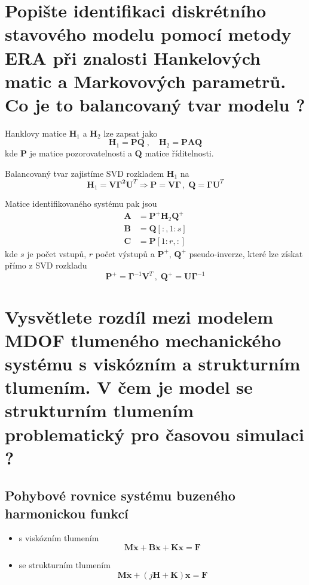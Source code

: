 \documentclass{article}
\begin{document}
	\pagebreak
	\section{Popište identifikaci diskrétního stavového modelu pomocí metody ERA při znalosti Hankelových matic a Markovových parametrů. Co je to balancovaný tvar modelu ? }

	Hanklovy matice $\bm{H}_1$ a $\bm{H}_2$ lze zapsat jako
	\begin{equation}
		\bm{H}_1 = \bm{P}\bm{Q}
		\;,\quad 
		\bm{H}_2 = \bm{P}\bm{A}\bm{Q}
	\end{equation}
	kde $\bm{P}$ je matice pozorovatelnosti a $\bm{Q}$ matice říditelnosti.

	Balancovaný tvar zajistíme SVD rozkladem $\bm{H}_1$ na
	\begin{equation}
		\bm{H}_1 = \bm{V}\bm{\Gamma^2}\bm{U}^T
		\Rightarrow
		\bm{P} = \bm{V}\bm{\Gamma} \,,\; \bm{Q} = \bm{\Gamma}\bm{U}^T
	\end{equation}

	Matice identifikovaného systému pak jsou
	\begin{align}
		\bm{A} &= \bm{P}^+ \bm{H}_2 \bm{Q}^+ \\
		\bm{B} &= \bm{Q}[:,1:s] \\
		\bm{C} &= \bm{P}[1:r,:]
	\end{align}
	kde $s$ je počet vstupů, $r$ počet výstupů a $\bm{P}^+$, $\bm{Q}^+$ pseudo-inverze, které lze získat přímo z SVD rozkladu
	\begin{equation}
		\bm{P}^+ = \bm{\Gamma}^{-1}\bm{V}^T
		\,,\;
		\bm{Q}^+ = \bm{U}\bm{\Gamma}^{-1}
	\end{equation}

	\section{Vysvětlete rozdíl mezi modelem MDOF tlumeného mechanického systému s viskózním a strukturním tlumením. V čem je model se strukturním tlumením problematický pro časovou simulaci ? }

	\subsection*{Pohybové rovnice systému buzeného harmonickou funkcí}
	\begin{itemize}
		\item s viskózním tlumením
		\begin{equation}
			\bm{M}\bm{\ddot{x}} + \bm{B}\bm{\dot{x}} + \bm{K}\bm{x} = \bm{F}
		\end{equation}
		\item se strukturním tlumením
		\begin{equation}
			\bm{M}\bm{\ddot{x}} + (j\bm{H} + \bm{K}) \bm{x} = \bm{F}
		\end{equation}
	\end{itemize}
\end{document}
